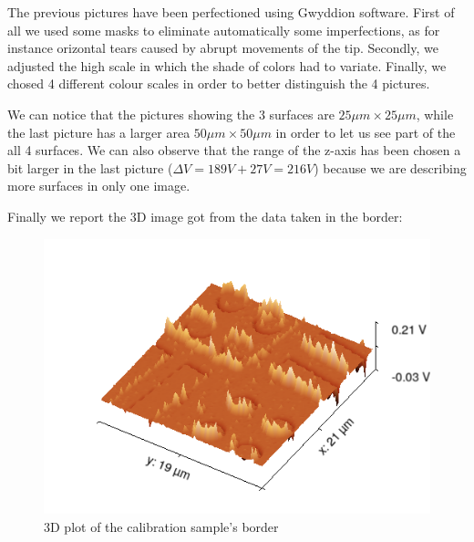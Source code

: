 \documentclass[11pt,a4paper]{article}
\begin{document}
The previous pictures have been perfectioned using Gwyddion software. First of all we used some masks to eliminate automatically some imperfections, as for instance orizontal tears caused by abrupt movements of the tip. Secondly, we adjusted the high scale in which the shade of colors had to variate. Finally, we chosed 4 different colour scales in order to better distinguish the 4 pictures.

We can notice that the pictures showing the 3 surfaces are $25\mu m \times 25 \mu m$, while the last picture has a larger area $50\mu m \times 50 \mu m$ in order to let us see part of the all 4 surfaces. We can also observe that the range of the z-axis has been chosen a bit larger in the last picture ($\Delta V=189V+27V=216V$) because we are describing more surfaces in only one image.

Finally we report the 3D image got from the data taken in the border:
\begin{figure}[ht]
\begin{center}
\includegraphics[scale=0.47]{sm_border_3D}
\caption{3D plot of the calibration sample's border}\label{fig: cal sam border}
\end{center}
\end{figure}
\end{document}
